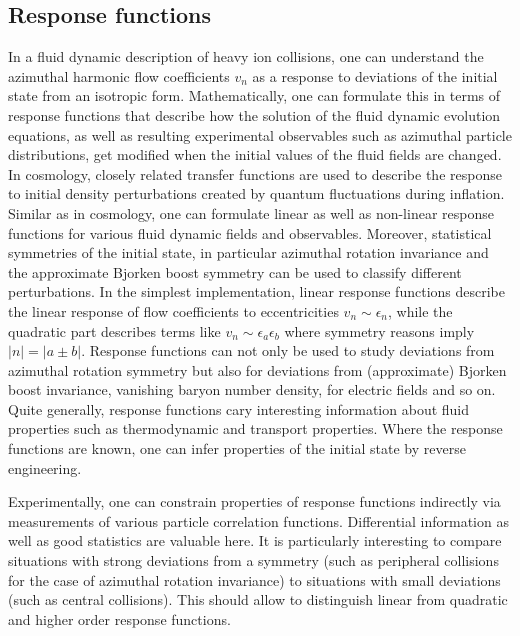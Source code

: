 \subsection{Response functions}

In a fluid dynamic description of heavy ion collisions,  one can understand the azimuthal harmonic flow coefficients $v_n$ as a response to deviations of the initial state from an isotropic form. Mathematically,  one can formulate this in terms of response functions that describe how the solution of the fluid dynamic evolution equations,  as well as resulting experimental observables such as azimuthal particle distributions,  get modified when the initial values of the fluid fields are changed. In cosmology,  closely related transfer functions are used to describe the response to initial density perturbations created by quantum fluctuations during inflation. Similar as in cosmology,  one can formulate linear as well as non-linear response functions for various fluid dynamic fields and observables. Moreover,  statistical symmetries of the initial state,  in particular azimuthal rotation invariance and the approximate Bjorken boost symmetry can be used to classify different perturbations. In the simplest implementation,  linear response functions describe the linear response of flow coefficients to eccentricities $v_n \sim\epsilon_n$,  while the quadratic part describes terms like $v_n \sim \epsilon_a\epsilon_b$ where symmetry reasons imply $|n|=|a\pm b|$. Response functions can not only be used to study deviations from azimuthal rotation symmetry but also for deviations from (approximate) Bjorken boost invariance,  vanishing baryon number density,  for electric fields and so on. Quite generally,  response functions cary interesting information about fluid properties such as thermodynamic and transport properties. Where the response functions are known,  one can infer properties of the initial state by reverse engineering.

Experimentally,  one can constrain properties of response functions indirectly via measurements of various particle correlation functions. Differential information as well as good statistics are valuable here. It is particularly interesting to compare situations with strong deviations from a symmetry (such as peripheral collisions for the case of azimuthal rotation invariance) to situations with small deviations (such as central collisions). This should allow to distinguish linear from quadratic and higher order response functions.

